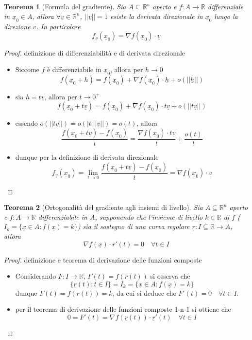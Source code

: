 \documentclass[12pt, a4paper]{article}
\theoremstyle{break}
\newtheorem{theorem}{Teorema} %
\begin{document}
\newpage
\begin{theorem} [Formula del gradiente]
	Sia $A \subseteq \mathbb{R}^n$ aperto e $f: A \to \mathbb{R}$
	differenziale in $\underline{x}_0 \in A$, allora $\forall \underline{v} \in
		\mathbb{R}^n$, $||\underline{v}|| = 1$ esiste la derivata direzionale in
	$\underline{x}_0$ lungo la direzione $\underline{v}$. In particolare
	\[
		f_{\underline{v}}(\underline{x}_0) = \nabla f(\underline{x}_0) \cdot
		\underline{v}
	\]
\end{theorem}
\begin{proof} definizione di differenziabilità e di derivata direzionale
	\begin{itemize}
		\item Siccome $f$ è differenziabile in $\underline{x}_0$, allora per $h
				\to 0$
			\[
				f(\underline{x}_0 + h) = f(\underline{x}_0) + \nabla f
				(\underline{x}_0) \cdot \underline{h}
				+ o(||\underline{h}||)
			\]
		\item sia $\underline{h} = t \underline{v}$, allora per $t \to 0^+$
			\[
				f(\underline{x}_0 + t \underline{v}) = f(\underline{x}_0) +
				\nabla f (\underline{x}_0) \cdot t \underline{v}
				+ o(||t \underline{v}||)
			\]
		\item essendo $o(||t \underline{v}||) = o(|t| || \underline{v}||) =
				o(t)$, allora
			\[
				\frac{f(\underline{x}_0 + t \underline{v}) -
				f(\underline{x}_0)}{t} = \frac{\nabla f (\underline{x}_0) \cdot
				t \underline{v}}{t} + \frac{o(t)}{t}
			\]
		\item dunque per la definizione di derivata direzionale
			\[
				f_{\underline{v}}(\underline{x}_0)
				= \lim_{t \to 0} \frac{f(\underline{x}_0 + t \underline{v}) -
				f(\underline{x}_0)}{t}
				= \nabla f(\underline{x}_0) \cdot \underline{v}
			\]
	\end{itemize}
\end{proof}

\newpage
\begin{theorem} [Ortogonalità del gradiente agli insiemi di livello]
	Sia $A \subseteq \mathbb{R}^n$ aperto e $f: A \to \mathbb{R}$
	differenziabile in $A$, supponendo che l'insieme di livello $k \in
		\mathbb{R}$ di $f$ ($I_k = \{\underline{x} \in A: f(\underline{x}) = k
		\}$) sia il sostegno di una curva regolare $\underline{r}: I \subseteq
		\mathbb{R} \to A$, allora
	\[
		\nabla f(\underline{x}) \cdot r'(t) = 0 \quad \forall t \in I
	\]
\end{theorem}
\begin{proof} definizione e teorema di derivazione delle funzioni composte
	\begin{itemize}
		\item Considerando $F:I \to \mathbb{R}$, $F(t) = f(r(t))$
			si osserva che
			\[
				\{\underline{r}(t): t \in I\} = I_k = \{\underline{x} \in A:
				f(\underline{x}) = k \}
			\]
			dunque $F(t) = f(r(t)) = k$, da cui si deduce che $F'(t) = 0 \quad
				\forall t \in I$.
		\item per il teorema di derivazione delle funzioni composte 1-n-1 si
			ottiene che
			\[
				0 = F'(t) = \nabla f(\underline{r}(t)) \cdot \underline{r}'(t)
				\quad \forall t \in I
			\]
	\end{itemize}
\end{proof}
\end{document}
